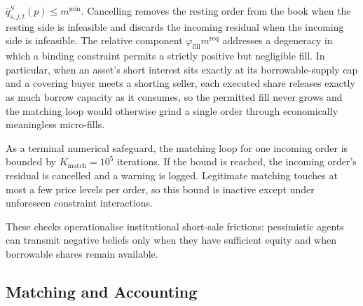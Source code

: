 \documentclass[12pt, a4paper]{article}
\begin{document}
    \(\bar q_{s,j,t}^{S}(p)\le m^{\min}\). Cancelling removes the resting order
    from the book when the resting side is infeasible and discards the incoming
    residual when the incoming side is infeasible. The relative component
    \(\varphi_{\mathrm{fill}}m^{\mathrm{req}}\) addresses a degeneracy in which
    a binding constraint permits a strictly positive but negligible fill. In
    particular, when an asset's short interest sits exactly at its
    borrowable-supply cap and a covering buyer meets a shorting seller, each
    executed share releases exactly as much borrow capacity as it consumes, so
    the permitted fill never grows and the matching loop would otherwise grind
    a single order through economically meaningless micro-fills.

    As a terminal numerical safeguard, the matching loop for one incoming order
    is bounded by \(K_{\mathrm{match}}=10^{5}\) iterations. If the bound is
    reached, the incoming order's residual is cancelled and a warning is logged.
    Legitimate matching touches at most a few price levels per order, so this
    bound is inactive except under unforeseen constraint interactions.

    These
    checks operationalise institutional short-sale frictions: pessimistic agents
    can transmit negative beliefs only when they have sufficient equity and when
    borrowable shares remain available.

    \subsection{Matching and Accounting}
\end{document}
